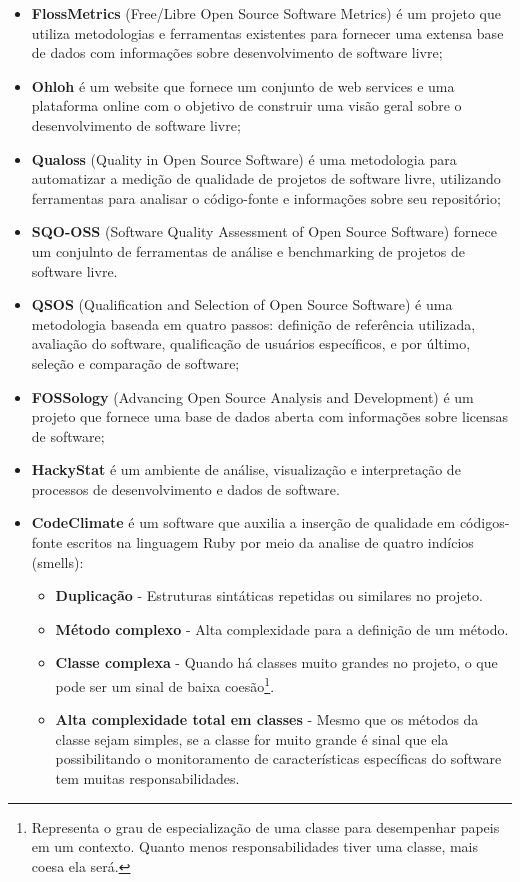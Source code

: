 \begin{itemize}
\item \textbf{FlossMetrics} (Free/Libre Open Source Software Metrics) é um projeto que utiliza metodologias e ferramentas existentes para fornecer  uma extensa base de dados com informações sobre desenvolvimento de software livre;
\item \textbf{Ohloh} é um website que fornece um conjunto de web services e uma plataforma online com o objetivo de construir uma visão geral sobre o desenvolvimento de software livre;
\item \textbf{Qualoss} (Quality in Open Source Software) é  uma metodologia para automatizar a medição de qualidade de projetos de software livre, utilizando ferramentas para analisar o código-fonte e informações sobre seu repositório;
\item \textbf{SQO-OSS} (Software Quality Assessment of Open Source Software) fornece um conjulnto de ferramentas de análise e benchmarking de projetos de software livre.
\item \textbf{QSOS} (Qualification and Selection of Open Source Software) é uma metodologia baseada em quatro passos: definição de referência utilizada, avaliação do software, qualificação de usuários específicos, e por último, seleção e comparação de software;
\item \textbf{FOSSology} (Advancing Open Source Analysis and Development) é um projeto que fornece uma base de dados aberta com informações sobre licensas de software;
\item \textbf{HackyStat} é um ambiente de análise, visualização e interpretação de processos de desenvolvimento e dados de software.
\item \textbf{CodeClimate} é um software que auxilia a inserção de qualidade em códigos-fonte escritos na linguagem Ruby por meio da analise de quatro indícios (smells): 
	\begin{itemize}
	\item \textbf{Duplicação} - Estruturas sintáticas repetidas ou similares no projeto.
	\item \textbf{Método complexo} - Alta complexidade para a definição de um método.
	\item \textbf{Classe complexa} - Quando há classes muito grandes no projeto, o que pode ser um sinal de baixa coesão\footnote{Representa o grau de especialização de uma classe para desempenhar papeis em um contexto. Quanto menos responsabilidades tiver uma classe, mais coesa ela será.}.
	\item \textbf{Alta complexidade total em classes} - Mesmo que os métodos da classe sejam simples, se a classe for muito grande é sinal que ela possibilitando o monitoramento de características específicas do software tem muitas responsabilidades.
	\end{itemize}
\end{itemize}
    
